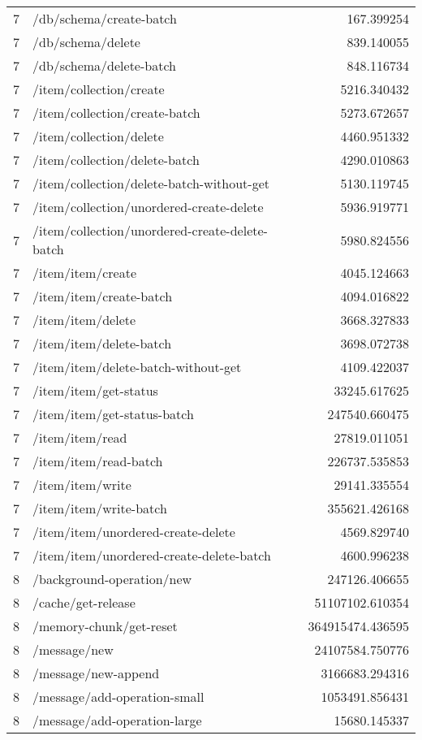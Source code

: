 \begin{longtable}{rlr}
7 & /db/schema/create-batch & 167.399254 \\
7 & /db/schema/delete & 839.140055 \\
7 & /db/schema/delete-batch & 848.116734 \\
7 & /item/collection/create & 5216.340432 \\
7 & /item/collection/create-batch & 5273.672657 \\
7 & /item/collection/delete & 4460.951332 \\
7 & /item/collection/delete-batch & 4290.010863 \\
7 & /item/collection/delete-batch-without-get & 5130.119745 \\
7 & /item/collection/unordered-create-delete & 5936.919771 \\
7 & /item/collection/unordered-create-delete-batch & 5980.824556 \\
7 & /item/item/create & 4045.124663 \\
7 & /item/item/create-batch & 4094.016822 \\
7 & /item/item/delete & 3668.327833 \\
7 & /item/item/delete-batch & 3698.072738 \\
7 & /item/item/delete-batch-without-get & 4109.422037 \\
7 & /item/item/get-status & 33245.617625 \\
7 & /item/item/get-status-batch & 247540.660475 \\
7 & /item/item/read & 27819.011051 \\
7 & /item/item/read-batch & 226737.535853 \\
7 & /item/item/write & 29141.335554 \\
7 & /item/item/write-batch & 355621.426168 \\
7 & /item/item/unordered-create-delete & 4569.829740 \\
7 & /item/item/unordered-create-delete-batch & 4600.996238 \\
8 & /background-operation/new & 247126.406655 \\
8 & /cache/get-release & 51107102.610354 \\
8 & /memory-chunk/get-reset & 364915474.436595 \\
8 & /message/new & 24107584.750776 \\
8 & /message/new-append & 3166683.294316 \\
8 & /message/add-operation-small & 1053491.856431 \\
8 & /message/add-operation-large & 15680.145337 \\

\end{longtable}
